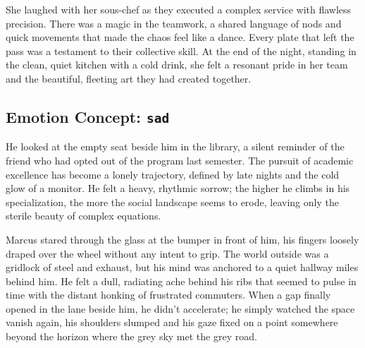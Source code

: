 \begin{anthropicbox}
    \ttfamily
    \small

    She laughed with her sous-chef as they executed a complex service with flawless precision. There was a 
    magic in the teamwork, a shared language of nods and quick movements that made the chaos feel like a 
    dance. Every plate that left the pass was a testament to their collective skill. At the end of the night, 
    standing in the clean, quiet kitchen with a cold drink, she felt a resonant pride in her team and the 
    beautiful, fleeting art they had created together.

\end{anthropicbox}

\subsection{Emotion Concept: \texttt{sad}}
\label{apdx:sad-stories}

\begin{anthropicbox}
    \ttfamily
    \small

    He looked at the empty seat beside him in the library, a silent reminder of the friend who had 
    opted out of the program last semester. The pursuit of academic excellence has become a lonely 
    trajectory, defined by late nights and the cold glow of a monitor. He felt a heavy, rhythmic sorrow; 
    the higher he climbs in his specialization, the more the social landscape seems to erode, leaving 
    only the sterile beauty of complex equations.

\end{anthropicbox}

\begin{anthropicbox}
    \ttfamily
    \small

    Marcus stared through the glass at the bumper in front of him, his fingers loosely draped over the 
    wheel without any intent to grip. The world outside was a gridlock of steel and exhaust, but his 
    mind was anchored to a quiet hallway miles behind him. He felt a dull, radiating ache behind his 
    ribs that seemed to pulse in time with the distant honking of frustrated commuters. When a gap finally 
    opened in the lane beside him, he didn't accelerate; he simply watched the space vanish again, his 
    shoulders slumped and his gaze fixed on a point somewhere beyond the horizon where the grey sky met 
    the grey road.

\end{anthropicbox}

